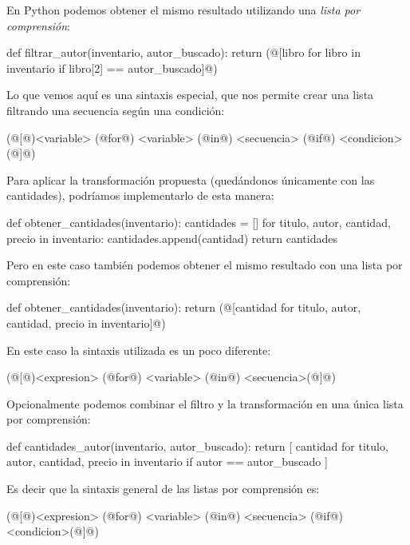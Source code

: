 \begin{subappendices}
En Python podemos obtener el mismo resultado utilizando una \emph{lista por
comprensión}:

\begin{codigo-python-sn}
def filtrar_autor(inventario, autor_buscado):
    return (@[libro for libro in inventario if libro[2] == autor_buscado]@)
\end{codigo-python-sn}

Lo que vemos aquí es una sintaxis especial, que nos permite crear una lista
filtrando una secuencia según una condición:

\begin{codigo-python-sn}
(@[@)<variable> (@for@) <variable> (@in@) <secuencia> (@if@) <condicion>(@]@)
\end{codigo-python-sn}

Para aplicar la transformación propuesta (quedándonos únicamente con las
cantidades), podríamos implementarlo de esta manera:

\begin{codigo-python-sn}
def obtener_cantidades(inventario):
    cantidades = []
    for titulo, autor, cantidad, precio in inventario:
        cantidades.append(cantidad)
    return cantidades
\end{codigo-python-sn}

Pero en este caso también podemos obtener el mismo resultado con una lista por
comprensión:

\begin{codigo-python-sn}
def obtener_cantidades(inventario):
    return (@[cantidad for titulo, autor, cantidad, precio in inventario]@)
\end{codigo-python-sn}

En este caso la sintaxis utilizada es un poco diferente:

\begin{codigo-python-sn}
(@[@)<expresion> (@for@) <variable> (@in@) <secuencia>(@]@)
\end{codigo-python-sn}

Opcionalmente podemos combinar el filtro y la transformación en una única lista
por comprensión:

\begin{codigo-python-sn}
def cantidades_autor(inventario, autor_buscado):
    return [
        cantidad
        for titulo, autor, cantidad, precio in inventario
        if autor == autor_buscado
    ]
\end{codigo-python-sn}

\begin{observacion}
Es decir que la sintaxis general de las listas por comprensión es:
\begin{codigo-python-sn}
(@[@)<expresion> (@for@) <variable> (@in@) <secuencia> (@if@) <condicion>(@]@)
\end{codigo-python-sn}
\end{observacion}


\end{subappendices}
